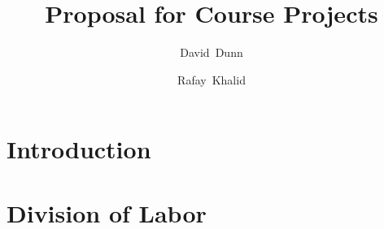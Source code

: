 \documentclass[twoside]{article}
\begin{document}
\title{Proposal for Course Projects}

\author{David~Dunn}
\author{Rafay~Khalid}

\maketitle

%
\section{Introduction}

\section{Division of Labor}

 

\end{document}
